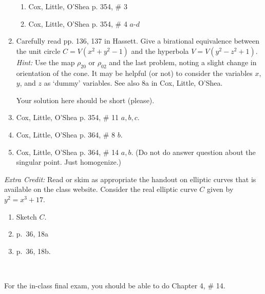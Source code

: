 \documentclass[11pt]{report}
\begin{document}
\begin{enumerate}
\begin{enumerate}
\item Cox, Little, O'Shea p. 354, \# 3

\item Cox, Little, O'Shea p. 354, \# 4 $a$-$d$

\end{enumerate}

\item Carefully read pp. 136, 137 in Hassett.  Give a birational equivalence between
the unit circle $C = V(x^2 + y^2 - 1)$ and the hyperbola $V = V(y^2 - z^2 + 1)$.  
\emph{Hint:} Use the map $\rho_{20}$ or $\rho_{02}$ and the last problem, noting
a slight change in orientation of the cone.  It may be helpful (or not) to consider
the variables $x$, $y$, and $z$ as `dummy' variables.  See also 8a in Cox, Little, O'Shea.

Your solution here should be short (please).

\item Cox, Little, O'Shea p. 354, \# 11 $a, b, c$.

\item Cox, Little, O'Shea p. 364, \# 8 $b$.

\item Cox, Little, O'Shea p. 364, \# 14 $a, b$. (Do not do answer question about the singular point.  Just homogenize.)

\end{enumerate}

\smallskip 

\noindent \emph{Extra Credit:}  Read or skim as appropriate the handout on elliptic curves that
is available on the class website. 
Consider the real elliptic curve $C$ given by $y^2 = x^3 + 17$.   

\begin{enumerate}

\item Sketch $C$.

\item p.~36, 18a

\item p.~36, 18b.

\end{enumerate}

\

 For the in-class final exam, you should be able to do Chapter 4, \# 14.
\end{document}
